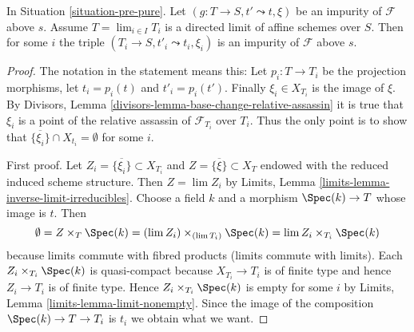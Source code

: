 \begin{lemma}
\label{lemma-impure-limit}
In Situation \ref{situation-pre-pure}.
Let $(g : T \to S, t' \leadsto t, \xi)$ be an impurity of
$\mathcal{F}$ above $s$. Assume $T = \lim_{i \in I} T_i$
is a directed limit of affine schemes over $S$. Then for
some $i$ the triple $(T_i \to S, t'_i \leadsto t_i, \xi_i)$
is an impurity of $\mathcal{F}$ above $s$.
\end{lemma}

\begin{proof}
The notation in the statement means this: Let $p_i : T \to T_i$
be the projection morphisms, let $t_i = p_i(t)$ and $t'_i = p_i(t')$.
Finally $\xi_i \in X_{T_i}$ is the image of $\xi$. By
Divisors, Lemma \ref{divisors-lemma-base-change-relative-assassin}
it is true that $\xi_i$ is a point of the relative
assassin of $\mathcal{F}_{T_i}$ over $T_i$. Thus the only point is to
show that $\overline{\{\xi_i\}} \cap X_{t_i} = \emptyset$ for some $i$.

\medskip\noindent
First proof. Let $Z_i = \overline{\{\xi_i\}} \subset X_{T_i}$
and $Z = \overline{\{\xi\}} \subset X_T$
endowed with the reduced induced scheme structure.
Then $Z = \lim Z_i$ by
Limits, Lemma \ref{limits-lemma-inverse-limit-irreducibles}.
Choose a field $k$ and a morphism $\Spec(k) \to T$ whose image is $t$.
Then
$$
\emptyset =
Z \times_T \Spec(k) = (\lim Z_i) \times_{(\lim T_i)} \Spec(k)
= \lim Z_i \times_{T_i} \Spec(k)
$$
because limits commute with fibred products (limits commute with limits).
Each $Z_i \times_{T_i} \Spec(k)$ is quasi-compact because $X_{T_i} \to T_i$
is of finite type and hence $Z_i \to T_i$ is of finite type.
Hence $Z_i \times_{T_i} \Spec(k)$ is empty for some $i$ by
Limits, Lemma \ref{limits-lemma-limit-nonempty}.
Since the image of the composition $\Spec(k) \to T \to T_i$ is $t_i$
we obtain what we want.


\end{proof}
